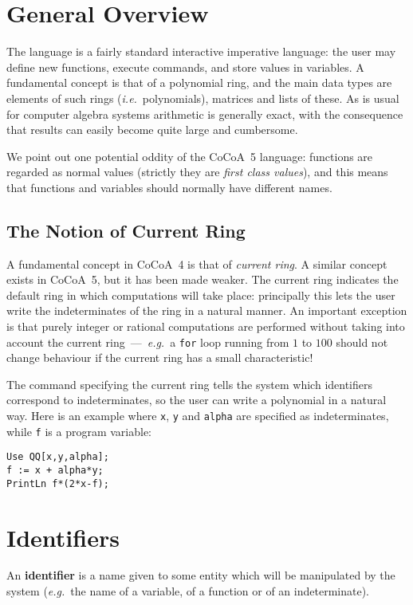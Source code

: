 \documentclass{book}[12,a4paper]
\def\ie{{\it i.e.}}
\def\eg{{\it e.g.}}
\begin{document}
\section{General Overview}

The language is a fairly standard interactive imperative language: the user
may define new functions, execute commands, and store values in variables.
A fundamental concept is that of a polynomial ring, and the main data types
are elements of such rings (\ie~polynomials), matrices and lists of these.
As is usual for computer algebra systems arithmetic is generally exact,
with the consequence that results can easily become quite large and
cumbersome.

We point out one potential oddity of the CoCoA~5 language: functions are
regarded as normal values (strictly they are {\it first class values}), and
this means that functions and variables should normally have different names.

\subsection{The Notion of Current Ring}

A fundamental concept in CoCoA~4 is that of \textit{current ring}.  A
similar concept exists in CoCoA~5, but it has been made weaker.  The
current ring indicates the default ring in which computations will take
place: principally this lets the user write the indeterminates of the
ring in a natural manner.  An important exception is that purely integer or
rational computations are performed without taking into account the current
ring~---~\eg~a \texttt{for} loop running from $1$ to $100$ should not
change behaviour if the current ring has a small characteristic!

The command specifying the current ring tells the system which identifiers
correspond to indeterminates, so the user can write a polynomial in a
natural way.  Here is an example where \texttt{x}, \texttt{y} and
\texttt{alpha} are specified as indeterminates, while \texttt{f} is a
program variable:
\begin{lstlisting}
Use QQ[x,y,alpha];
f := x + alpha*y;
PrintLn f*(2*x-f);
\end{lstlisting}


\section{Identifiers}
\label{identifiers}

An \textbf{identifier} is a name given to some entity which will be
manipulated by the system (\eg~the name of a variable, of a function or of
an indeterminate).
\end{document}
